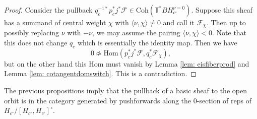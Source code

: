 \documentclass{amsart}
\theoremstyle{definition}
\theoremstyle{remark}
\numberwithin{equation}{section}
\newcommand{\mc}{\mathcal}
\newcommand{\Hom}{\mathrm{Hom}}
\newcommand{\Coh}{\mathrm{Coh}}
\newcommand{\T}{\mathbb{T}}
\begin{document}
\begin{proof}
Consider the pullback $q^{-1 \ast}_cp^{\ast}_cj^{\ast} \mc{F} \in \Coh(\T^{\ast}BH_{c^{\circ}}^{\nu = 0})$. Suppose this sheaf has a summand of central weight $\chi$ with $\langle \nu,\chi\rangle\neq 0$ and call it $\mc{F}_{\chi}$. Then up to possibly replacing $\nu$ with $- \nu$, we may assume the pairing $\langle \nu, \chi \rangle < 0$. Note that this does not change $q_c$ which is essentially the identity map. Then we have
\begin{equation*}
    0 \not\simeq \Hom(p^{\ast}_c j^{\ast} \mc{F}, q_c^*\mc{F}_{\chi}),
\end{equation*}    
but on the other hand this $\Hom$ must vanish by Lemma \ref{lem: eisfiberprod} and Lemma \ref{lem: cotangentdomswitch}. This is a contradiction.
\end{proof}

The previous propositions imply that the pullback of a basic sheaf to the open orbit is in the category generated by pushforwards along the $0$-section of reps of $H_{c^{\circ}}/[H_{c^{\circ}}, H_{c^{\circ}}]^\circ$.
\end{document}
